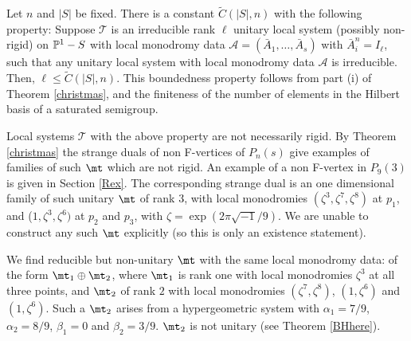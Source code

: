 \begin{remark}
\notready\label{Hilberty} Let $n$ and $|S|$ be fixed.  There is a constant $\tilde{C}(|S|,n)$ with the following property:
 Suppose $\mathcal{T}$ is an irreducible  rank $\ell$ unitary local system (possibly non-rigid) on $\Bbb{P}^1-S$ with local monodromy data $\mathcal{A}=(\bar{A}_1,\dots,\bar{A}_s)$ with $\bar{A}_i^n=I_{\ell}$, such that any unitary local system with local monodromy data $\mathcal{A}$ is irreducible. Then, $\ell\leq \tilde{C}(|S|,n)$. This boundedness property follows from part (i) of Theorem \ref{christmas}, and the finiteness  of the number of elements in the Hilbert basis of a saturated semigroup.

Local systems  $\mathcal{T}$ with the  above property are not necessarily rigid. By Theorem \ref{christmas} the strange duals of non F-vertices of $P_n(s)$ give examples of families of such $\mt$ which are not rigid.  An example of a non F-vertex in $P_9(3)$ is given in Section \ref{Rex}. The corresponding strange dual is an one dimensional family of such unitary $\mt$ of rank $3$, with local monodromies $(\zeta^3,\zeta^7,\zeta^8)$ at $p_1$, and ($1,\zeta^3,\zeta^6)$ at $p_2$ and $p_3$, with $\zeta=\exp(2\pi\sqrt{-1}/9)$.  We are unable to construct any such $\mt$ explicitly (so this is only an existence statement).

We find reducible but non-unitary $\mt$ with the same local monodromy data: of the form $\mt_1\oplus\mt_2$, where $\mt_1$ is rank one with local monodromies $\zeta^3$ at all three points, and $\mt_2$ of rank $2$ with local monodromies $(\zeta^7,\zeta^8)$, $(1,\zeta^6)$ and $(1,\zeta^6)$. Such a $\mt_2$ arises from a hypergeometric system with $\alpha_1=7/9$, $\alpha_2=8/9$, $\beta_1=0$ and $\beta_2=3/9$. $\mt_2$ is not unitary (see Theorem \ref{BHhere}).

\end{remark}
